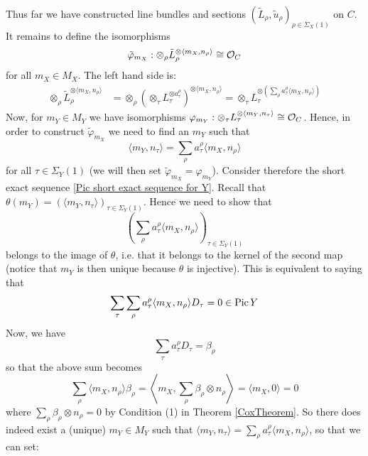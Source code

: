Thus far we have constructed line bundles and sections $(\tilde{L}_\rho, \tilde{u}_\rho)_{\rho \in \Sigma_X(1)}$ on $C$. It remains to define the isomorphisms
\begin{equation*} \tilde{\varphi}_{m_X} : \otimes_\rho \tilde{L}_\rho^{\otimes \langle m_X, n_\rho \rangle} \cong \mathcal{O}_C \end{equation*}
for all $m_X \in M_X$. The left hand side is:
\begin{align*} \otimes_\rho \tilde{L}_\rho^{\otimes \langle m_X, n_\rho \rangle} & = \otimes_\rho \left( \otimes_\tau L_\tau^{\otimes a_\tau^\rho} \right)^{\otimes \langle m_X, n_\rho \rangle} = \otimes_\tau L_\tau^{\otimes \left( \sum_{\rho} a_\tau^\rho  \langle m_X, n_\rho \rangle \right)} \end{align*}
Now, for $m_Y \in M_Y$ we have isomorphisms $\varphi_{m_Y} : \otimes_\tau L_\tau^{\otimes \langle m_Y, n_\tau \rangle} \cong \mathcal{O}_C$. Hence, in order to construct $\tilde{\varphi}_{m_X}$ we need to find an $m_Y$ such that
\begin{equation*} \langle m_Y, n_\tau \rangle = \sum_\rho a_\tau^\rho \langle m_X, n_\rho \rangle \end{equation*}
for all $\tau \in \Sigma_Y(1)$ (we will then set $\tilde{\varphi}_{m_X} = \varphi_{m_Y}$). Consider therefore the short exact sequence \eqref{Pic short exact sequence for Y}. Recall that $\theta(m_Y) = (\langle m_Y, n_\tau \rangle)_{\tau \in \Sigma_Y(1)}$. Hence we need to show that
\begin{equation*} \left( \sum_\rho a_\tau^\rho \langle m_X, n_\rho \rangle \right)_{\tau \in \Sigma_Y(1)} \end{equation*}
belongs to the image of $\theta$, i.e. that it belongs to the kernel of the second map (notice that $m_Y$ is then unique because $\theta$ is injective). This is equivalent to saying that
\begin{equation*} \sum_\tau \sum_\rho a_\tau^\rho \langle m_X, n_\rho \rangle D_\tau = 0 \in \operatorname{Pic} Y \end{equation*}
Now, we have
\begin{equation*} \sum_\tau a_\tau^\rho D_\tau = \beta_\rho \end{equation*}
so that the above sum becomes
\begin{equation*} \sum_\rho \langle m_X, n_\rho \rangle \beta_\rho = \left\langle m_X, \sum_\rho \beta_\rho \otimes n_\rho \right \rangle = \langle m_X, 0 \rangle = 0 \end{equation*}
where $\sum_\rho \beta_\rho \otimes n_\rho = 0$ by Condition (1) in Theorem \ref{CoxTheorem}. So there does indeed exist a (unique) $m_Y \in M_Y$ such that $\langle m_Y, n_\tau \rangle = \sum_\rho a_\tau^\rho \langle m_X, n_\rho \rangle$, so that we can set:
